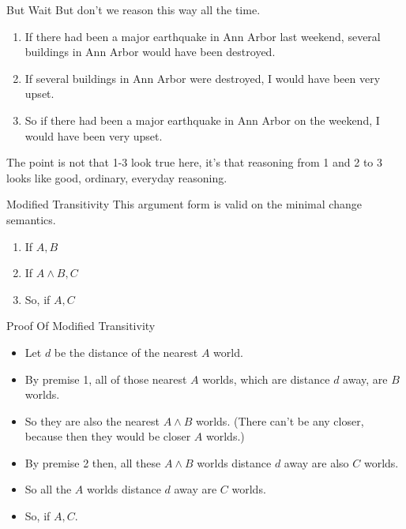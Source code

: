 \documentclass[
  ignorenonframetext,
]{beamer}
\providecommand{\tightlist}{%
  \setlength{\itemsep}{0pt}\setlength{\parskip}{0pt}}
\renewcommand{\,}{\text{, }}
\begin{document}
\begin{frame}{But Wait}
\protect\hypertarget{but-wait}{}
But don't we reason this way all the time.

\begin{enumerate}
\tightlist
\item
  If there had been a major earthquake in Ann Arbor last weekend,
  several buildings in Ann Arbor would have been destroyed. \pause 
\item
  If several buildings in Ann Arbor were destroyed, I would have been
  very upset. \pause 
\item
  So if there had been a major earthquake in Ann Arbor on the weekend, I
  would have been very upset.
\end{enumerate}

The point is not that 1-3 look true here, it's that reasoning from 1 and
2 to 3 looks like good, ordinary, everyday reasoning.
\end{frame}

\begin{frame}{Modified Transitivity}
\protect\hypertarget{modified-transitivity}{}
This argument form is valid on the minimal change semantics.

\begin{enumerate}
\tightlist
\item
  If \(A, B\)
\item
  If \(A \wedge B, C\)
\item
  So, if \(A, C\)
\end{enumerate}
\end{frame}

\begin{frame}{Proof Of Modified Transitivity}
\protect\hypertarget{proof-of-modified-transitivity}{}
\begin{itemize}
\tightlist
\item
  Let \(d\) be the distance of the nearest \(A\) world.
\item
  By premise 1, all of those nearest \(A\) worlds, which are distance
  \(d\) away, are \(B\) worlds. \pause 
\item
  So they are also the nearest \(A \wedge B\) worlds. (There can't be
  any closer, because then they would be closer \(A\) worlds.) \pause 
\item
  By premise 2 then, all these \(A \wedge B\) worlds distance \(d\) away
  are also \(C\) worlds.
\item
  So all the \(A\) worlds distance \(d\) away are \(C\) worlds. \pause 
\item
  So, if \(A, C\).
\end{itemize}
\end{frame}
\end{document}
